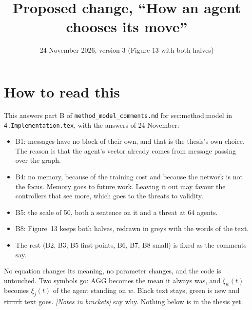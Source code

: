 \documentclass[11pt,a4paper]{article}
\title{Proposed change, ``How an agent chooses its move''}
\date{24 November 2026, version 3 (Figure 13 with both halves)}
\newcommand{\new}[1]{\textcolor{newc}{#1}}
\newcommand{\old}[1]{\textcolor{gray}{\sout{#1}}}
\newcommand{\note}[1]{{\small\itshape [#1]}}
\newcommand{\lab}[1]{\textsf{\footnotesize #1}}
\begin{document}
\sloppy
\maketitle

\section*{How to read this}
This answers part B of \texttt{method\_model\_comments.md} for
\lab{sec:method:model} in \texttt{4.Implementation.tex}, with the answers
of 24 November:
\begin{itemize}[nosep]
  \item B1: messages have no block of their own, and that is the thesis's
    own choice. The reason is that the agent's vector already comes from
    message passing over the graph.
  \item B4: no memory, because of the training cost and because the network
    is not the focus. Memory goes to future work. Leaving it out may favour
    the controllers that see more, which goes to the threats to validity.
  \item B5: the scale of 50, both a sentence on it and a threat at 64 agents.
  \item B8: Figure~13 keeps both halves, redrawn in greys with the words of the text.
  \item The rest (B2, B3, B5 first points, B6, B7, B8 small) is fixed as
    the comments say.
\end{itemize}
No equation changes its meaning, no parameter changes, and the code is
untouched. Two symbols go: $\mathrm{AGG}$ becomes the mean it always was,
and $\bar\xi_w(t)$ becomes $\xi_j(t)$ of the agent standing on $w$. Black
text stays, \new{green} is new and \old{struck} text goes.
\note{Notes in brackets} say why. Nothing below is in the thesis yet.
\end{document}
